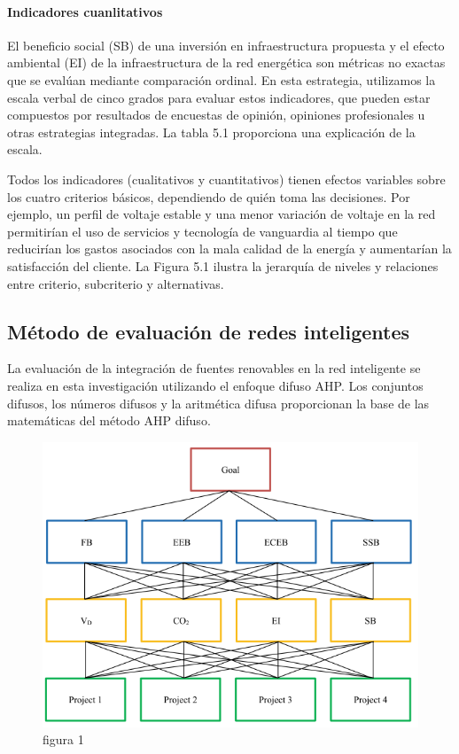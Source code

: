 \documentclass[
]{article}
\begin{document}
\hypertarget{indicadores-cuanlitativos}{%
\paragraph{Indicadores cuanlitativos}\label{indicadores-cuanlitativos}}

El beneficio social (SB) de una inversión en infraestructura propuesta y
el efecto ambiental (EI) de la infraestructura de la red energética son
métricas no exactas que se evalúan mediante comparación ordinal. En esta
estrategia, utilizamos la escala verbal de cinco grados para evaluar
estos indicadores, que pueden estar compuestos por resultados de
encuestas de opinión, opiniones profesionales u otras estrategias
integradas. La tabla 5.1 proporciona una explicación de la escala.

Todos los indicadores (cualitativos y cuantitativos) tienen efectos
variables sobre los cuatro criterios básicos, dependiendo de quién toma
las decisiones. Por ejemplo, un perfil de voltaje estable y una menor
variación de voltaje en la red permitirían el uso de servicios y
tecnología de vanguardia al tiempo que reducirían los gastos asociados
con la mala calidad de la energía y aumentarían la satisfacción del
cliente. La Figura 5.1 ilustra la jerarquía de niveles y relaciones
entre criterio, subcriterio y alternativas.

\hypertarget{muxe9todo-de-evaluaciuxf3n-de-redes-inteligentes}{%
\subsection{Método de evaluación de redes
inteligentes}\label{muxe9todo-de-evaluaciuxf3n-de-redes-inteligentes}}

La evaluación de la integración de fuentes renovables en la red
inteligente se realiza en esta investigación utilizando el enfoque
difuso AHP. Los conjuntos difusos, los números difusos y la aritmética
difusa proporcionan la base de las matemáticas del método AHP difuso.

\begin{figure}
\centering
\includegraphics{fotos/foto_diagrama.png}
\caption{figura 1}
\end{figure}
\end{document}
